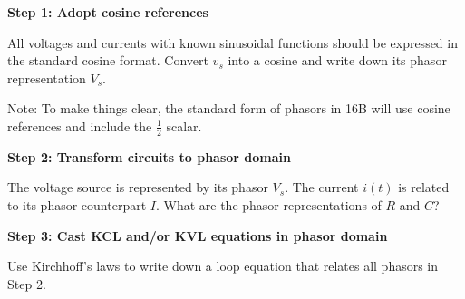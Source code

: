 \begin{enumerate}

\qitem \textbf{Step 1: Adopt cosine references}

All voltages and currents with known sinusoidal functions
should be expressed in the standard cosine format.
Convert $v_s$ into a cosine and write down its phasor representation $V_s$.

Note: To make things clear, the standard form of phasors in 16B will use
cosine references and include the $\frac{1}{2}$ scalar.




\qitem \textbf{Step 2: Transform circuits to phasor domain}

The voltage source is represented by its phasor $V_s$.
The current $i(t)$ is related to its phasor counterpart $I$. 
What are the phasor representations of $R$ and $C$?



\qitem \textbf{Step 3: Cast KCL and/or KVL equations in phasor domain}

Use Kirchhoff's laws to write down a loop equation that relates all phasors in Step 2. 


\end{enumerate}
